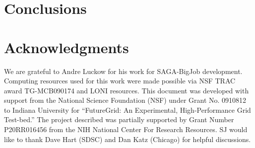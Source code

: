 \documentclass{sig-alternate}
\begin{document}
\section{Conclusions}



\section{Acknowledgments}
We are grateful to Andre Luckow for his work for SAGA-BigJob development.  Computing resources used for this
work were made possible via NSF TRAC award TG-MCB090174 and LONI
resources.  This document was developed with support from the National
Science Foundation (NSF) under Grant No.  0910812 to Indiana
University for ``FutureGrid: An Experimental, High-Performance Grid
Test-bed.'' The project described was partially supported by Grant
Number P20RR016456 from the NIH National Center For Research
Resources. SJ would like to thank Dave Hart (SDSC) and Dan Katz
(Chicago) for helpful discussions.



\end{document}
